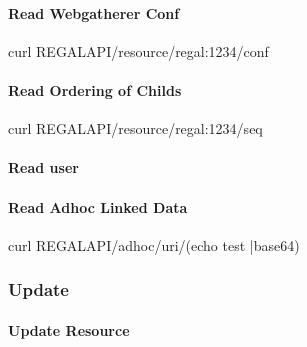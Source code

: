 \documentclass[letterpaper,10pt,english]{sphinxmanual}
\begin{document}
\paragraph{Read Webgatherer Conf}
\label{\detokenize{api-toscience:read-webgatherer-conf}}\label{\detokenize{api-toscience:id13}}
\begin{sphinxVerbatim}[commandchars=\\\{\}]
curl \PYGZdl{}REGAL\PYGZus{}API/resource/regal:1234/conf
\end{sphinxVerbatim}


\paragraph{Read Ordering of Childs}
\label{\detokenize{api-toscience:read-ordering-of-childs}}\label{\detokenize{api-toscience:id14}}
\begin{sphinxVerbatim}[commandchars=\\\{\}]
curl \PYGZdl{}REGAL\PYGZus{}API/resource/regal:1234/seq
\end{sphinxVerbatim}


\paragraph{Read user}
\label{\detokenize{api-toscience:read-user}}\label{\detokenize{api-toscience:id15}}
\begin{sphinxVerbatim}[commandchars=\\\{\}]
 
\end{sphinxVerbatim}


\paragraph{Read Adhoc Linked Data}
\label{\detokenize{api-toscience:read-adhoc-linked-data}}\label{\detokenize{api-toscience:id16}}
\begin{sphinxVerbatim}[commandchars=\\\{\}]
curl \PYGZdl{}REGAL\PYGZus{}API/adhoc/uri/\PYGZdl{}(echo test |base64)
\end{sphinxVerbatim}


\subsubsection{Update}
\label{\detokenize{api-toscience:update}}\label{\detokenize{api-toscience:id17}}

\paragraph{Update Resource}
\label{\detokenize{api-toscience:update-resource}}\label{\detokenize{api-toscience:id18}}
\end{document}
